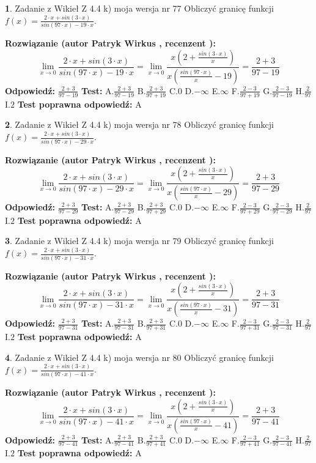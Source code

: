 \documentclass[12pt, a4paper]{article}
\theoremstyle{definition} %
\newtheorem{zad}{}
\newcommand{\zadStart}[1]{\begin{zad}#1\newline}
\newcommand{\zadStop}{\end{zad}}
\newcommand{\rozwStart}[2]{\noindent \textbf{Rozwiązanie (autor #1 , recenzent #2): }\newline}
\newcommand{\rozwStop}{\newline}
\newcommand{\odpStart}{\noindent \textbf{Odpowiedź:}\newline}
\newcommand{\odpStop}{\newline}
\newcommand{\testStart}{\noindent \textbf{Test:}\newline}
\newcommand{\testStop}{\newline}
\newcommand{\kluczStart}{\noindent \textbf{Test poprawna odpowiedź:}\newline}
\newcommand{\kluczStop}{\newline}
\begin{document}
\zadStart{Zadanie z Wikieł Z 4.4 k) moja wersja nr 77}
Obliczyć granicę funkcji $f(x)=\frac{2\cdot x +sin(3\cdot x)}{sin(97\cdot x) -19\cdot x}$.
\zadStop
\rozwStart{Patryk Wirkus}{}
$$\lim\limits_{x\to 0}\frac{2\cdot x +sin(3\cdot x)}{sin(97\cdot x) -19\cdot x}
=\lim\limits_{x\to 0}\frac{x(2+\frac{sin(3\cdot x)}{x})}{x(\frac{sin(97\cdot x)}{x}-19)}
=\frac{2+3}{97-19}$$
\rozwStop
\odpStart
$\frac{2+3}{97-19}$
\odpStop
\testStart
A.$\frac{2+3}{97-19}$
B.$\frac{2+3}{97+19}$
C.$0$
D.$-\infty$
E.$\infty$
F.$\frac{2-3}{97+19}$
G.$\frac{2-3}{97-19}$
H.$\frac{2}{97}$
I.$2$
\testStop
\kluczStart
A
\kluczStop



\zadStart{Zadanie z Wikieł Z 4.4 k) moja wersja nr 78}
Obliczyć granicę funkcji $f(x)=\frac{2\cdot x +sin(3\cdot x)}{sin(97\cdot x) -29\cdot x}$.
\zadStop
\rozwStart{Patryk Wirkus}{}
$$\lim\limits_{x\to 0}\frac{2\cdot x +sin(3\cdot x)}{sin(97\cdot x) -29\cdot x}
=\lim\limits_{x\to 0}\frac{x(2+\frac{sin(3\cdot x)}{x})}{x(\frac{sin(97\cdot x)}{x}-29)}
=\frac{2+3}{97-29}$$
\rozwStop
\odpStart
$\frac{2+3}{97-29}$
\odpStop
\testStart
A.$\frac{2+3}{97-29}$
B.$\frac{2+3}{97+29}$
C.$0$
D.$-\infty$
E.$\infty$
F.$\frac{2-3}{97+29}$
G.$\frac{2-3}{97-29}$
H.$\frac{2}{97}$
I.$2$
\testStop
\kluczStart
A
\kluczStop



\zadStart{Zadanie z Wikieł Z 4.4 k) moja wersja nr 79}
Obliczyć granicę funkcji $f(x)=\frac{2\cdot x +sin(3\cdot x)}{sin(97\cdot x) -31\cdot x}$.
\zadStop
\rozwStart{Patryk Wirkus}{}
$$\lim\limits_{x\to 0}\frac{2\cdot x +sin(3\cdot x)}{sin(97\cdot x) -31\cdot x}
=\lim\limits_{x\to 0}\frac{x(2+\frac{sin(3\cdot x)}{x})}{x(\frac{sin(97\cdot x)}{x}-31)}
=\frac{2+3}{97-31}$$
\rozwStop
\odpStart
$\frac{2+3}{97-31}$
\odpStop
\testStart
A.$\frac{2+3}{97-31}$
B.$\frac{2+3}{97+31}$
C.$0$
D.$-\infty$
E.$\infty$
F.$\frac{2-3}{97+31}$
G.$\frac{2-3}{97-31}$
H.$\frac{2}{97}$
I.$2$
\testStop
\kluczStart
A
\kluczStop



\zadStart{Zadanie z Wikieł Z 4.4 k) moja wersja nr 80}
Obliczyć granicę funkcji $f(x)=\frac{2\cdot x +sin(3\cdot x)}{sin(97\cdot x) -41\cdot x}$.
\zadStop
\rozwStart{Patryk Wirkus}{}
$$\lim\limits_{x\to 0}\frac{2\cdot x +sin(3\cdot x)}{sin(97\cdot x) -41\cdot x}
=\lim\limits_{x\to 0}\frac{x(2+\frac{sin(3\cdot x)}{x})}{x(\frac{sin(97\cdot x)}{x}-41)}
=\frac{2+3}{97-41}$$
\rozwStop
\odpStart
$\frac{2+3}{97-41}$
\odpStop
\testStart
A.$\frac{2+3}{97-41}$
B.$\frac{2+3}{97+41}$
C.$0$
D.$-\infty$
E.$\infty$
F.$\frac{2-3}{97+41}$
G.$\frac{2-3}{97-41}$
H.$\frac{2}{97}$
I.$2$
\testStop
\kluczStart
A
\kluczStop
\end{document}
